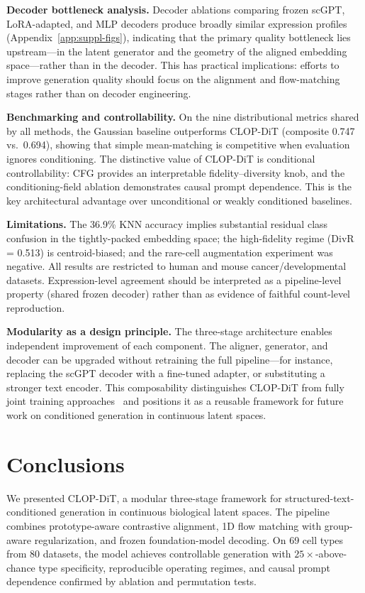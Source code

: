 \textbf{Decoder bottleneck analysis.} Decoder ablations comparing frozen scGPT, LoRA-adapted, and MLP decoders produce broadly similar expression profiles (Appendix~\ref{app:suppl-figs}), indicating that the primary quality bottleneck lies upstream---in the latent generator and the geometry of the aligned embedding space---rather than in the decoder. This has practical implications: efforts to improve generation quality should focus on the alignment and flow-matching stages rather than on decoder engineering.

\textbf{Benchmarking and controllability.} On the nine distributional metrics shared by all methods, the Gaussian baseline outperforms CLOP-DiT (composite 0.747 vs.\ 0.694), showing that simple mean-matching is competitive when evaluation ignores conditioning. The distinctive value of CLOP-DiT is conditional controllability: CFG provides an interpretable fidelity--diversity knob, and the conditioning-field ablation demonstrates causal prompt dependence. This is the key architectural advantage over unconditional or weakly conditioned baselines.

\textbf{Limitations.} The 36.9\% KNN accuracy implies substantial residual class confusion in the tightly-packed embedding space; the high-fidelity regime (DivR = 0.513) is centroid-biased; and the rare-cell augmentation experiment was negative. All results are restricted to human and mouse cancer/developmental datasets. Expression-level agreement should be interpreted as a pipeline-level property (shared frozen decoder) rather than as evidence of faithful count-level reproduction.

\textbf{Modularity as a design principle.} The three-stage architecture enables independent improvement of each component. The aligner, generator, and decoder can be upgraded without retraining the full pipeline---for instance, replacing the scGPT decoder with a fine-tuned adapter, or substituting a stronger text encoder. This composability distinguishes CLOP-DiT from fully joint training approaches~\citep{ref-scdesign3} and positions it as a reusable framework for future work on conditioned generation in continuous latent spaces.

\section{Conclusions}\label{sec:conclusions}

We presented CLOP-DiT, a modular three-stage framework for structured-text-conditioned generation in continuous biological latent spaces. The pipeline combines prototype-aware contrastive alignment, 1D flow matching with group-aware regularization, and frozen foundation-model decoding. On 69 cell types from 80 datasets, the model achieves controllable generation with $25\times$-above-chance type specificity, reproducible operating regimes, and causal prompt dependence confirmed by ablation and permutation tests.

